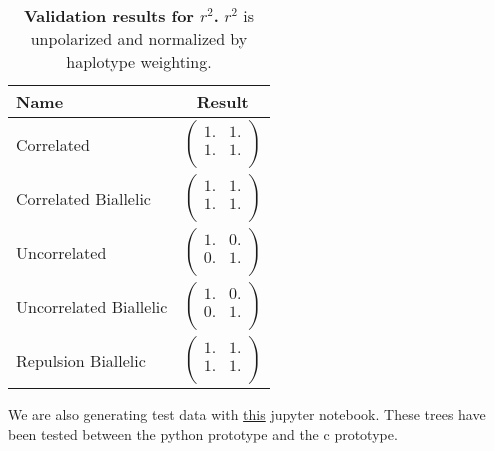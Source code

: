 \documentclass[12pt]{article}
\begin{document}
\begin{table}[H]
  \begin{tabular}{lc} Name & Result \\
    \hline
    Correlated & $\left(\begin{array}{cc}
                          1. & 1. \\
                          1. & 1. \\
                        \end{array}\right)$ \\
    Correlated Biallelic & $\left(\begin{array}{cc}
                                    1. & 1. \\
                                    1. & 1. \\
                                  \end{array}\right)$ \\
    Uncorrelated & $\left(\begin{array}{cc}
                            1. & 0. \\
                            0. & 1. \\
                          \end{array}\right)$ \\
    Uncorrelated Biallelic & $\left(\begin{array}{cc}
                                      1. & 0. \\
                                      0. & 1. \\
                                    \end{array}\right)$ \\
    Repulsion Biallelic & $\left(\begin{array}{cc}
                                   1. & 1. \\
                                   1. & 1. \\
                                 \end{array}\right)$ \\
  \end{tabular}
  \caption{
    \textbf{Validation results for $r^2$.}
    $r^2$ is unpolarized and normalized by haplotype weighting.
  }
\end{table}

We are also generating test data with
\href{https://github.com/lkirk/ts-two-locus-proto/blob/main/notebooks/TestCases.ipynb}{this}
jupyter notebook. These trees have been tested between the python prototype and
the c prototype.
\end{document}

